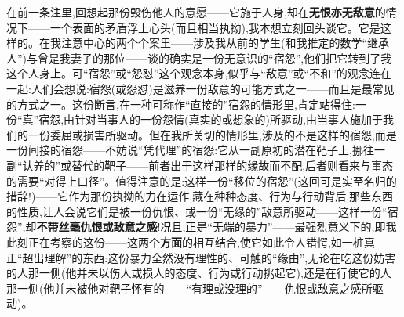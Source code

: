 在前一条注里,回想起那份毁伤他人的意愿\dmark{}——它施于人身,却在\textbf{无恨亦无敌意}的情况下——一个表面的矛盾浮上心头(而且相当执拗),我本想立刻回头谈它。它是这样的。在我注意中心的两个个案里——涉及我从前的学生(和我推定的数学“继承人”)与曾是我妻子的那位——谈的确实是一份无意识的“宿怨”,他们把它转到了我这个人身上。可“宿怨”或“怨怼”这个观念本身,似乎与“敌意”或“不和”的观念连在一起:人们会想说:宿怨(或怨怼)是滋养一份敌意的可能方式之一——而且是最常见的方式之一。这份断言,在一种可称作“直接的”宿怨的情形里,肯定站得住:一份“真”宿怨,由针对当事人的一份怨情(真实的或想象的)所驱动,由当事人施加于我们的一份委屈或损害所驱动。但在我所关切的情形里,涉及的不是这样的宿怨,而是一份间接的宿怨——不妨说“凭代理”的宿怨:它从一副原初的潜在靶子上,挪往一副“认养的”或替代的靶子——前者出于这样那样的缘故而不配,后者则看来与事态的需要“对得上口径”。值得注意的是:这样一份“移位的宿怨”(这回可是实至名归的措辞!)——它作为那份执拗的力在运作,藏在种种态度、行为与行动背后,那些东西的性质,让人会说它们是被一份仇恨\dmark{}、或一份“无缘的”敌意所驱动——这样一份“宿怨”,却\textbf{不带丝毫仇恨或敌意之感}!况且,正是“无端的暴力”——最强烈意义下的,即我此刻正在考察的这份——这两个\textbf{方面}的相互结合,使它如此令人错愕,如一桩真正“超出理解”的东西:这份暴力全然没有理性的、可触的“缘由”,无论在吃这份妨害的人那一侧(他并未以伤人或损人的态度、行为或行动挑起它),还是在行使它的人那一侧(他并未被他对靶子怀有的——“有理或没理的”——仇恨或敌意之感所驱动)。

